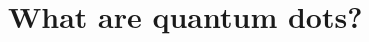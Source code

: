 
\graphicspath{{Mainmatter/figures/PNG/}{Mainmatter/figures/PDF/}{Mainmatter/figures/}}

\chapter{What are quantum dots?}

